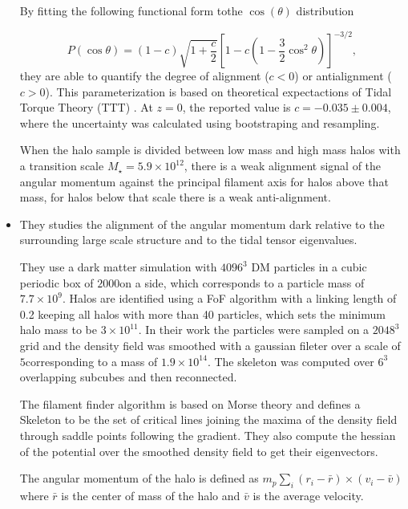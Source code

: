 \documentclass[useAMS,usenatbib]{mn2e}
\newcommand{\hMpc}{{\ifmmode{h^{-1}{\rm Mpc}}\else{$h^{-1}$Mpc }\fi}}
\newcommand{\Msun}{{\ifmmode{{\rm {M_{\odot}}}}\else{${\rm{M_{\odot}}}$}\fi}}
\begin{document}
\begin{itemize}
By fitting the following functional form tothe $\cos(\theta)$ distribution

\begin{equation}
P(\cos\theta) =
(1-c)\sqrt{1+\frac{c}{2}}\left[1-c\left(1-\frac{3}{2}\cos^{2}\theta
  \right)\right]^{-3/2}, 
\label{eq:distro}
\end{equation}
%
they are able to quantify the degree of alignment ($c<0$) or
antialignment ($c>0$).  This parameterization is based on theoretical
expectactions of Tidal Torque Theory (TTT) \citep{Lee2005}. At $z=0$,
the reported value is $c = −0.035 \pm 0.004$, where the uncertainty
was calculated using bootstraping and resampling. 

When the halo sample is divided between low mass and high mass halos
with a transition scale $M_{\star}=5.9\times 10^{12}$\Msun, there is
a weak alignment signal of the angular momentum against the
principal filament axis for halos above that mass, for halos below
that scale there is a weak anti-alignment.

\item 
\cite{Codis2012}

They studies the alignment of the angular momentum dark relative to
the surrounding large scale structure and to the tidal tensor
eigenvalues.

They use a dark matter simulation with $4096^3$ DM particles in a
cubic periodic box of $2000$\hMpc on a side, which corresponds to a
particle mass of $7.7\times 10^9$\Msun. Halos are identified
using a FoF algorithm with a linking length of 0.2 keeping all halos
with more than 40 particles, which sets the minimum halo mass to be
$3\times 10^{11}$\Msun. In their work the particles were sampled on a
$2048^3$ grid and the density field was smoothed with a gaussian
fileter over a scale of $5$\hMpc corresponding to a mass of $1.9\times
10^{14}$. The skeleton was computed over $6^{3}$ overlapping subcubes
and then reconnected. 

The filament finder algorithm is based on Morse theory and defines a
Skeleton to be the set of critical lines joining the maxima of the
density field through saddle points following the gradient. They also
compute the hessian of the potential over the smoothed density field
to get their eigenvectors.

The angular momentum of the halo is defined as $m_{p}\sum_{i}(r_i-\bar{r})\times
(v_i-\bar{v})$ where $\bar{r}$ is the center of mass of the halo and
$\bar{v}$ is the average velocity.


\end{itemize}
\end{document}
